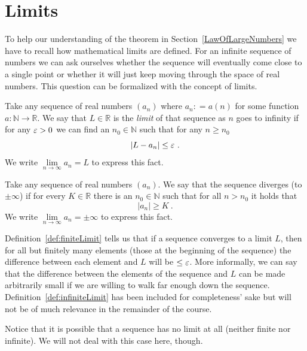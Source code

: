 \section{Limits}
To help our understanding of the theorem in Section~\ref{LawOfLargeNumbers} we have to recall how mathematical limits are defined. For an infinite sequence of numbers we can ask ourselves whether the sequence will eventually come close to a single point or whether it will just keep moving through the space of real numbers. This
question can be formalized with the concept of limits.

\begin{Definition}\label{def:finiteLimit}
Take any sequence of real numbers $ \left( a_{n} \right) $ where $ a_{n} : = a(n) $ for some function $ a : \mathbb{N} \rightarrow \mathbb{R} $.
We say that $ L \in \mathbb{R} $ is the \emph{limit} of that sequence as $ n $ goes to infinity if for any $ \varepsilon > 0 $ we can find an 
$ n_{0} \in \mathbb{N} $ such that for any $ n \geq n_{0} $
$$ |L - a_{n}| \leq \varepsilon\ . $$
We write $ \underset{n \rightarrow \infty}{\lim} a_{n} = L $ to express this fact.
\end{Definition}

\begin{Definition}\label{def:infiniteLimit}
Take any sequence of real numbers $ \left( a_{n} \right) $. We say that the sequence diverges (to $ \pm \infty $) if for every $ K \in \mathbb{R} $ there is 
an $ n_{0} \in \mathbb{N} $ such that for all $ n > n_{0} $ it holds that
$$ |a_{n}| \geq K \ . $$
We write $ \underset{n \rightarrow \infty}{\lim} a_{n} = \pm \infty $ to express this fact.
\end{Definition}

Definition~\ref{def:finiteLimit} tells us that if a sequence converges to a limit $ L $, then for all but finitely many elements (those at the beginning of the sequence)
the difference between each element and $ L $ will be $ \leq \varepsilon $. More informally, we can say that the difference between the elements of the sequence and $ L $
can be made arbitrarily small if we are willing to walk far enough down the sequence. Definition~\ref{def:infiniteLimit} has been included for completeness' sake but will 
not be of much relevance in the remainder of the course. 

Notice that it is possible that a sequence has no limit at all (neither finite nor infinite). We will not deal with this case here, though. 

